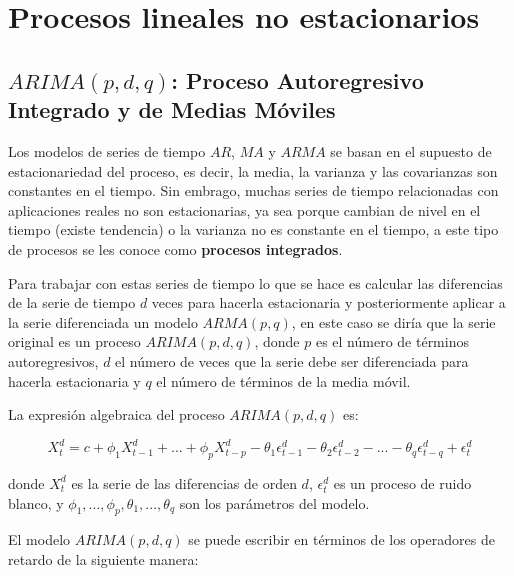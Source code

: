 \documentclass[
  a4paper,
  oneside,
  openany]{book}
\begin{document}
\hypertarget{part-procesos-lineales-no-estacionarios}{%
\part{Procesos lineales no estacionarios}\label{part-procesos-lineales-no-estacionarios}}

\hypertarget{arimapdq-proceso-autoregresivo-integrado-y-de-medias-muxf3viles}{%
\chapter{\texorpdfstring{\(ARIMA(p,d,q)\): Proceso Autoregresivo Integrado y de Medias Móviles}{ARIMA(p,d,q): Proceso Autoregresivo Integrado y de Medias Móviles}}\label{arimapdq-proceso-autoregresivo-integrado-y-de-medias-muxf3viles}}

Los modelos de series de tiempo \(AR\), \(MA\) y \(ARMA\) se basan en el supuesto de estacionariedad del proceso, es decir, la media, la varianza y las covarianzas son constantes en el tiempo. Sin embrago, muchas series de tiempo relacionadas con aplicaciones reales no son estacionarias, ya sea porque cambian de nivel en el tiempo (existe tendencia) o la varianza no es constante en el tiempo, a este tipo de procesos se les conoce como \textbf{procesos integrados}.

Para trabajar con estas series de tiempo lo que se hace es calcular las diferencias de la serie de tiempo \(d\) veces para hacerla estacionaria y posteriormente aplicar a la serie diferenciada un modelo \(ARMA(p,q)\), en este caso se diría que la serie original es un proceso \(ARIMA(p,d,q)\), donde \(p\) es el número de términos autoregresivos, \(d\) el número de veces que la serie debe ser diferenciada para hacerla estacionaria y \(q\) el número de términos de la media móvil.

La expresión algebraica del proceso \(ARIMA(p,d,q)\) es:

\[
X_t^d=c+\phi_1X_{t-1}^d+...+\phi_pX_{t-p}^d-\theta_1\epsilon_{t-1}^d-\theta_2\epsilon_{t-2}^d-...-\theta_q\epsilon_{t-q}^d+\epsilon_t^d
\]

donde \(X_t^d\) es la serie de las diferencias de orden \(d\), \(\epsilon_t^d\) es un proceso de ruido blanco, y \(\phi_1,...,\phi_p,\theta_1,...,\theta_q\) son los parámetros del modelo.

El modelo \(ARIMA(p,d,q)\) se puede escribir en términos de los operadores de retardo de la siguiente manera:
\end{document}
